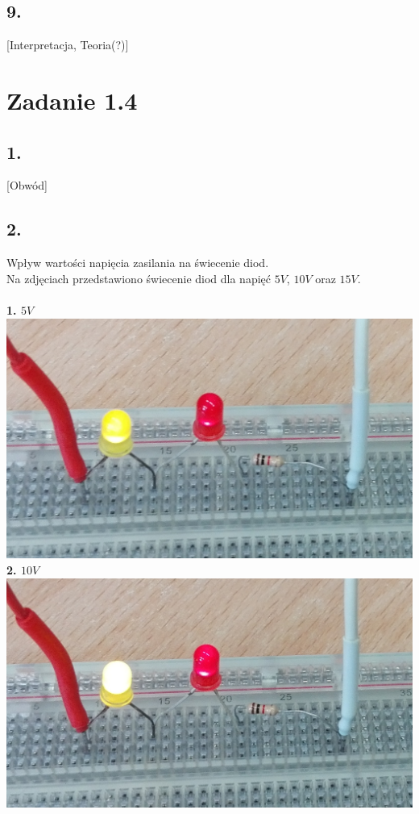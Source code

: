 \documentclass[polish,a4paper]{article}
\begin{document}
\subsection*{9.} [Interpretacja, Teoria(?)]


\section{Zadanie 1.4}


\subsection*{1.} [Obwód]
\newline

\subsection*{2.}
Wpływ wartości napięcia zasilania na świecenie diod.\\
Na zdjęciach przedstawiono świecenie diod dla napięć $5V$, $10V$ oraz $15V$.\\
\\
\textbf{1. $5V$}\\
\includegraphics[width=\textwidth]{5v}
\\
\textbf{2. $10V$}\\
\includegraphics[width=\textwidth]{10v}
\end{document}
